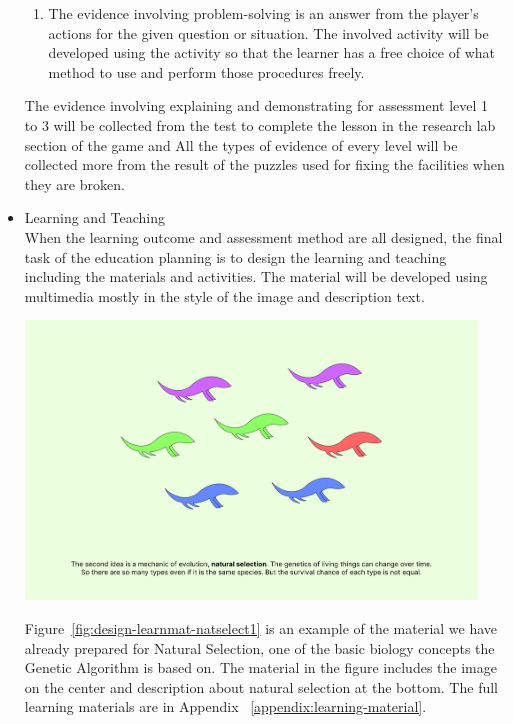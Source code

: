 \documentclass[12pt,oneside,openright,a4paper]{cpe-english-project}
\begin{document}
\begin{itemize}
\begin{enumerate}
		\item  The evidence involving problem-solving is an answer from the player's actions for the given question or situation. The involved activity will be developed using the activity so that the learner has a free choice of what method to use and perform those procedures freely.
	\end{enumerate}
	The evidence involving explaining and demonstrating for assessment level 1 to 3 will be collected from the test to complete the lesson in the research lab section of the game and All the types of evidence of every level will be collected more from the result of the puzzles used for fixing the facilities when they are broken.

	\item Learning and Teaching \\
	When the learning outcome and assessment method are all designed, the final task of the education planning is to design the learning and teaching including the materials and activities. The material will be developed using multimedia mostly in the style of the image and description text. 

	\begin{minipage}[c]{\textwidth}\centering
	\includegraphics[width=12cm]{figure/design-learnmat-natselect1.png}
	\label{fig:design-learnmat-natselect1}
	\end{minipage}

	Figure~\ref{fig:design-learnmat-natselect1} is an example of the material we have already prepared for Natural Selection, one of the basic biology concepts the Genetic Algorithm is based on. The material in the figure includes the image on the center and description about natural selection at the bottom. The full learning materials are in Appendix ~\ref{appendix:learning-material}.


\end{itemize}
\end{document}
